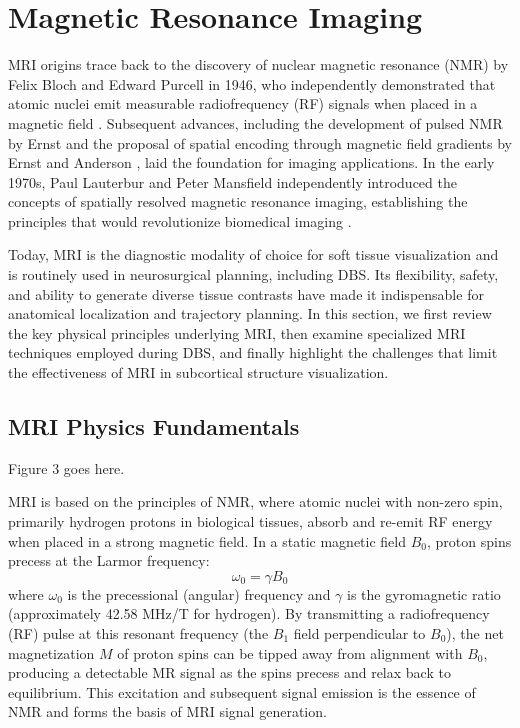 \section{Magnetic Resonance Imaging}
\label{sec:MRI}
MRI origins trace back to the discovery of nuclear magnetic resonance (NMR) by Felix Bloch and Edward Purcell in 1946, who independently demonstrated that atomic nuclei emit measurable radiofrequency (RF) signals when placed in a magnetic field \cite{Bloch1946-ob, Purcell1946-jd}. Subsequent advances, including the development of pulsed NMR by Ernst \cite{Ernst1990-we} and the proposal of spatial encoding through magnetic field gradients by Ernst and Anderson \cite{Ernst1966-yx}, laid the foundation for imaging applications. In the early 1970s, Paul Lauterbur and Peter Mansfield independently introduced the concepts of spatially resolved magnetic resonance imaging, establishing the principles that would revolutionize biomedical imaging \cite{Lauterbur1973-wf,Mansfield1977-ru}. 

Today, MRI is the diagnostic modality of choice for soft tissue visualization and is routinely used in neurosurgical planning, including DBS. Its flexibility, safety, and ability to generate diverse tissue contrasts have made it indispensable for anatomical localization and trajectory planning. In this section, we first review the key physical principles underlying MRI, then examine specialized MRI techniques employed during DBS, and finally highlight the challenges that limit the effectiveness of MRI in subcortical structure visualization.

\subsection{MRI Physics Fundamentals}

Figure 3 goes here. 

MRI is based on the principles of NMR, where atomic nuclei with non-zero spin, primarily hydrogen protons in biological tissues, absorb and re-emit RF energy when placed in a strong magnetic field. In a static magnetic field \(B_0\), proton spins precess at the Larmor frequency:
\begin{equation}
\omega_0 = \gamma B_0
\end{equation}
where \( \omega_0 \) is the precessional (angular) frequency and \( \gamma \) is the gyromagnetic ratio (approximately 42.58 MHz/T for hydrogen). By transmitting a radiofrequency (RF) pulse at this resonant frequency (the $B_1$ field perpendicular to $B_0$), the net magnetization $M$ of proton spins can be tipped away from alignment with $B_0$, producing a detectable MR signal as the spins precess and relax back to equilibrium. This excitation and subsequent signal emission is the essence of NMR and forms the basis of MRI signal generation.

